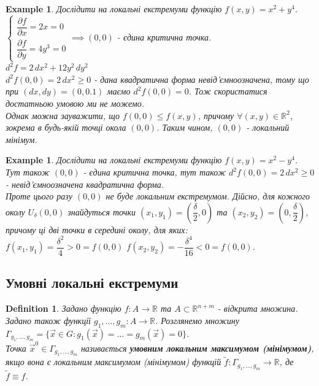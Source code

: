 \documentclass[a4paper, 10pt]{article}
\def\departial#1#2{\dfrac{\partial {#1}}{\partial {#2}}}
\theoremstyle{theoremdd}
\theoremstyle{theoremdd}
\theoremstyle{theoremdd}
\newtheorem{definition}[theorem]{Definition}
\theoremstyle{theoremdd}
\theoremstyle{theoremdd}
\newtheorem{example}[theorem]{Example}
\theoremstyle{theoremdd}
\theoremstyle{theoremdd}
\theoremstyle{theoremdd}
\theoremstyle{theoremdd}
\begin{document}
\begin{example}
Дослідити на локальні екстремуми функцію $f(x,y) = x^2+y^4$.\\
$\begin{cases} \departial{f}{x} = 2x = 0 \\ \departial{f}{y} = 4y^3 = 0 \end{cases} \implies (0,0)$ - єдина критична точка.\\
$d^2 f = 2\,dx^2 + 12y^2\,dy^2$\\
$d^2 f(0,0) = 2\,dx^2 \geq 0$ - дана квадратична форма невід'ємноозначена, тому що при $(dx,dy) = (0,0.1)$ маємо $d^2 f(0,0) = 0$. Тож скористатися достатньою умовою ми не можемо.\\
Однак можна зауважити, що $f(0,0) \leq f(x,y)$, причому $\forall (x,y) \in \mathbb{R}^2$, зокрема в будь-якій точці окола $(0,0)$. Таким чином, $(0,0)$ - локальний мінімум.
\end{example}

\begin{example}
Дослідити на локальні екстремуми функцію $f(x,y) = x^2-y^4$.\\
Тут також $(0,0)$ - єдина критична точка, тут також $d^2 f(0,0) = 2\,dx^2 \geq 0$ - невід'ємноозначена квадратична форма.\\
Проте цього разу $(0,0)$ не буде локальним екстремумом. Дійсно, для кожного околу $U_\delta (0,0)$ знайдуться точки $(x_1,y_1) = \left(\dfrac{\delta}{2}, 0 \right)$ та $(x_2,y_2) = \left(0, \dfrac{\delta}{2} \right)$, причому ці дві точки в середині околу, для яких:\\
$f(x_1,y_1) = \dfrac{\delta^2}{4} > 0 = f(0,0)$ \hspace{2cm} $f(x_2,y_2) = - \dfrac{\delta^4}{16} < 0 = f(0,0)$.
\end{example}

\subsection{Умовні локальні екстремуми}
\begin{definition}
Задано функцію $f: A \to \mathbb{R}$ та $A \subset \mathbb{R}^{n+m}$ - відкрита множина. Задано також функції $g_1,\dots,g_m: A \to \mathbb{R}$. Розглянемо множину $\Gamma_{g_1,\dots,g_m} = \{ \vec{x} \in G: g_1(\vec{x}) = \dots = g_m(\vec{x}) = 0 \}$.\\
Точка $\vec{x}^0 \in \Gamma_{g_1,\dots,g_m}$ називається \textbf{умовним локальним максимумом (мінімумом)}, якщо вона є локальним максимумом (мінімумом) функцій $\tilde{f}: \Gamma_{g_1,\dots,g_m} \to \mathbb{R}$, де $\tilde{f} \equiv f$.
\end{definition}
\end{document}
